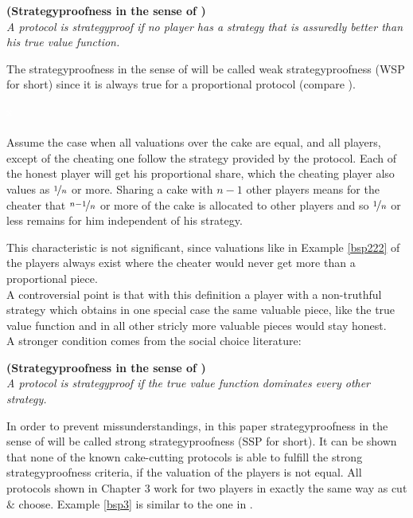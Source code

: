 \begin{defi}{\textbf{(Strategyproofness in the sense of \cite{pie})}}\\
\emph{A protocol is \emph{strategyproof} if no player has a strategy that is assuredly better than his true value function.}
\end{defi}
The strategyproofness in the sense of \cite{pie} will be called weak strategyproofness (WSP for short) since it is always true for a proportional protocol (compare \cite{ccc}).
\newpage
\begin{bsp}
\label{bsp222}
\textcolor{white}{x}\\\\
Assume the case when all valuations over the cake are equal, and all players, except of the cheating one follow the strategy provided by the protocol. Each of the honest player will get his proportional share, which the cheating player also values as $\nicefrac{1}{n}$ or more. Sharing a cake with $n-1$ other players means for the cheater that $\nicefrac{n-1}{n}$ or more of the cake is allocated to other players and so $\nicefrac{1}{n}$ or less remains for him independent of his strategy. 
\end{bsp}
This characteristic is not significant, since valuations like in Example \ref{bsp222} of the players always exist where the cheater would never get more than a proportional piece.\\
A controversial point is that with this definition a player with a non-truthful strategy which obtains in one special case the same valuable piece, like the true value function and in all other stricly more valuable pieces would stay honest.\\
\newline
A stronger condition comes from the social choice literature:

\begin{defi}{\textbf{(Strategyproofness in the sense of \cite{why})}}\\
\emph{A protocol is \emph{strategyproof} if the true value function dominates every other strategy.}
\end{defi}

In order to prevent missunderstandings, in this paper strategyproofness in the sense of \cite{why} will be called strong strategyproofness (SSP for short). It can be shown that none of the known cake-cutting protocols is able to fulfill the strong strategyproofness criteria, if the valuation of the players is not equal. All protocols shown in Chapter 3 work for two players in exactly the same way as cut $\&$ choose. Example \ref{bsp3} is similar to the one in \cite{chen:truth}.

